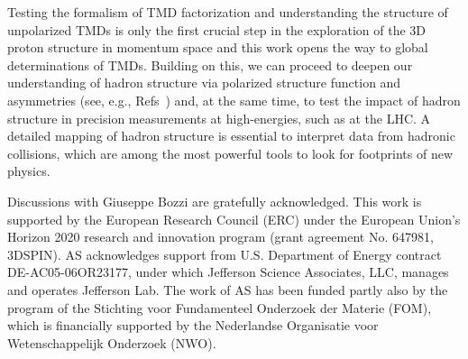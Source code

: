 \documentclass[aps,preprintnumbers,showpacs,nofootinbib,superscriptaddress,floatfix]{revtex4}
\begin{document}
Testing the formalism of TMD factorization and understanding the structure of unpolarized TMDs is only the first crucial step in the exploration of the 3D proton structure in momentum space and this work opens the way to global determinations of TMDs. 
Building on this, we can proceed to deepen our understanding of hadron
structure via polarized structure function and asymmetries (see, e.g.,
Refs~\cite{Aschenauer:2015ndk,Boglione:2015zyc,Kikola:2017hnp}) and, at the
same time, to test the impact of hadron structure in precision measurements at
high-energies, such as at the LHC. A detailed mapping of hadron structure is
essential to interpret data from hadronic collisions, which are among the most
powerful tools to look for footprints of new physics. 






\begin{acknowledgments}
Discussions with Giuseppe Bozzi are gratefully acknowledged.
This work is supported by the European Research Council (ERC) under the European Union's Horizon 2020 research and innovation program (grant agreement No. 647981, 3DSPIN). 
AS acknowledges support from U.S. Department of Energy contract DE-AC05-06OR23177, under which Jefferson Science Associates, LLC, manages and operates Jefferson Lab. 
The work of AS has been funded partly also by the program of the Stichting voor Fundamenteel Onderzoek der Materie (FOM), which is financially supported by the Nederlandse Organisatie voor Wetenschappelijk Onderzoek (NWO).
\end{acknowledgments}
%
%

%

%
%
\end{document}
